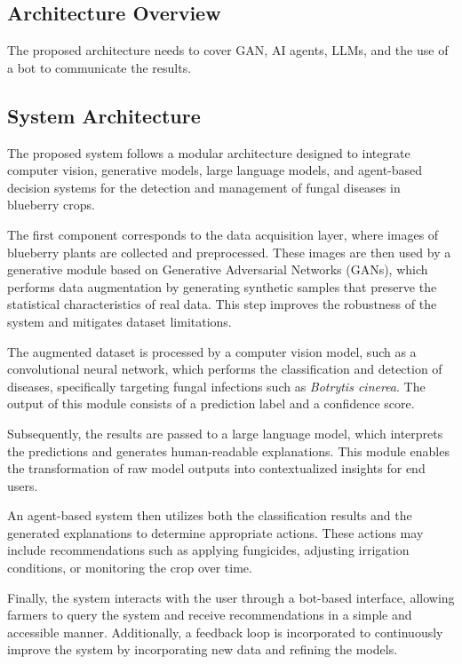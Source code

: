 \documentclass[11pt]{article}
\begin{document}
\subsection{Architecture Overview}
The proposed architecture needs to cover GAN, AI agents, LLMs, and the use of a bot to communicate the results.

\subsection{System Architecture}
The proposed system follows a modular architecture designed to integrate computer vision, generative models, large language models, and agent-based decision systems for the detection and management of fungal diseases in blueberry crops.

The first component corresponds to the data acquisition layer, where images of blueberry plants are collected and preprocessed. These images are then used by a generative module based on Generative Adversarial Networks (GANs), which performs data augmentation by generating synthetic samples that preserve the statistical characteristics of real data. This step improves the robustness of the system and mitigates dataset limitations.

The augmented dataset is processed by a computer vision model, such as a convolutional neural network, which performs the classification and detection of diseases, specifically targeting fungal infections such as \textit{Botrytis cinerea}. The output of this module consists of a prediction label and a confidence score.

Subsequently, the results are passed to a large language model, which interprets the predictions and generates human-readable explanations. This module enables the transformation of raw model outputs into contextualized insights for end users.

An agent-based system then utilizes both the classification results and the generated explanations to determine appropriate actions. These actions may include recommendations such as applying fungicides, adjusting irrigation conditions, or monitoring the crop over time.

Finally, the system interacts with the user through a bot-based interface, allowing farmers to query the system and receive recommendations in a simple and accessible manner. Additionally, a feedback loop is incorporated to continuously improve the system by incorporating new data and refining the models.
\end{document}
